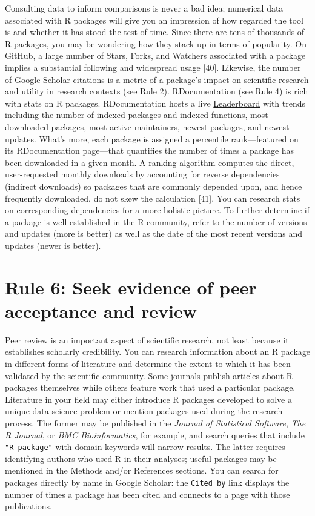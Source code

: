 \documentclass[10pt,letterpaper]{article}
\begin{document}
Consulting data to inform comparisons is never a bad idea; numerical
data associated with R packages will give you an impression of how
regarded the tool is and whether it has stood the test of time. Since
there are tens of thousands of R packages, you may be wondering how they
stack up in terms of popularity. On GitHub, a large number of Stars,
Forks, and Watchers associated with a package implies a substantial
following and widespread usage {[}40{]}. Likewise, the number of Google
Scholar citations is a metric of a package's impact on scientific
research and utility in research contexts (see Rule 2). RDocumentation
(see Rule 4) is rich with stats on R packages. RDocumentation hosts a
live \href{https://www.rdocumentation.org/trends}{Leaderboard} with
trends including the number of indexed packages and indexed functions,
most downloaded packages, most active maintainers, newest packages, and
newest updates. What's more, each package is assigned a percentile
rank---featured on its RDocumentation page---that quantifies the number
of times a package has been downloaded in a given month. A ranking
algorithm computes the direct, user-requested monthly downloads by
accounting for reverse dependencies (indirect downloads) so packages
that are commonly depended upon, and hence frequently downloaded, do not
skew the calculation {[}41{]}. You can research stats on corresponding
dependencies for a more holistic picture. To further determine if a
package is well-established in the R community, refer to the number of
versions and updates (more is better) as well as the date of the most
recent versions and updates (newer is better).

\hypertarget{rule-6-seek-evidence-of-peer-acceptance-and-review}{%
\section{Rule 6: Seek evidence of peer acceptance and
review}\label{rule-6-seek-evidence-of-peer-acceptance-and-review}}

Peer review is an important aspect of scientific research, not least
because it establishes scholarly credibility. You can research
information about an R package in different forms of literature and
determine the extent to which it has been validated by the scientific
community. Some journals publish articles about R packages themselves
while others feature work that used a particular package. Literature in
your field may either introduce R packages developed to solve a unique
data science problem or mention packages used during the research
process. The former may be published in the \emph{Journal of Statistical
Software}, \emph{The R Journal}, or \emph{BMC Bioinformatics}, for
example, and search queries that include \texttt{"R\ package"} with
domain keywords will narrow results. The latter requires identifying
authors who used R in their analyses; useful packages may be mentioned
in the Methods and/or References sections. You can search for packages
directly by name in Google Scholar: the \texttt{Cited\ by} link displays
the number of times a package has been cited and connects to a page with
those publications.
\end{document}

